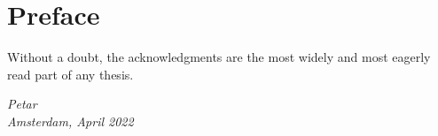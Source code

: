\chapter*{Preface}

Without a doubt, the acknowledgments are the most widely and most
eagerly read part of any thesis.

\begin{flushright}
{\makeatletter\itshape
    Petar \\
    Amsterdam, April 2022
\makeatother}
\end{flushright}


